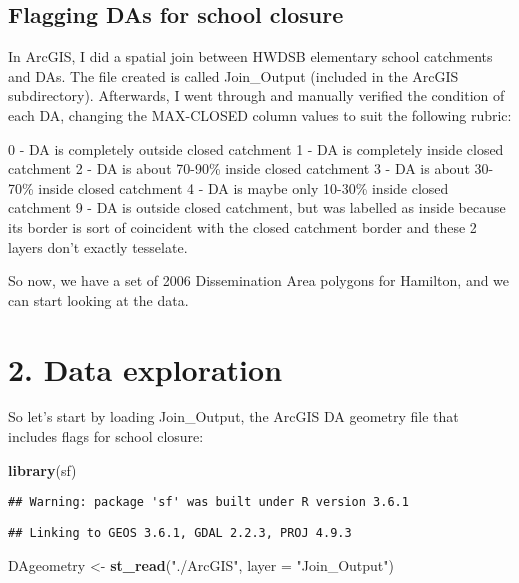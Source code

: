 \documentclass[]{article}
\newenvironment{Shaded}{\begin{snugshade}}{\end{snugshade}}
\newcommand{\DataTypeTok}[1]{\textcolor[rgb]{0.13,0.29,0.53}{#1}}
\newcommand{\KeywordTok}[1]{\textcolor[rgb]{0.13,0.29,0.53}{\textbf{#1}}}
\newcommand{\NormalTok}[1]{#1}
\newcommand{\StringTok}[1]{\textcolor[rgb]{0.31,0.60,0.02}{#1}}
\begin{document}
\hypertarget{flagging-das-for-school-closure}{%
\subsection{Flagging DAs for school
closure}\label{flagging-das-for-school-closure}}

In ArcGIS, I did a spatial join between HWDSB elementary school
catchments and DAs. The file created is called Join\_Output (included in
the ArcGIS subdirectory). Afterwards, I went through and manually
verified the condition of each DA, changing the MAX-CLOSED column values
to suit the following rubric:

0 - DA is completely outside closed catchment 1 - DA is completely
inside closed catchment 2 - DA is about 70-90\% inside closed catchment
3 - DA is about 30-70\% inside closed catchment 4 - DA is maybe only
10-30\% inside closed catchment 9 - DA is outside closed catchment, but
was labelled as inside because its border is sort of coincident with the
closed catchment border and these 2 layers don't exactly tesselate.

So now, we have a set of 2006 Dissemination Area polygons for Hamilton,
and we can start looking at the data.

\hypertarget{data-exploration}{%
\section{2. Data exploration}\label{data-exploration}}

So let's start by loading Join\_Output, the ArcGIS DA geometry file that
includes flags for school closure:

\begin{Shaded}
\begin{Highlighting}[]
\KeywordTok{library}\NormalTok{(sf)}
\end{Highlighting}
\end{Shaded}

\begin{verbatim}
## Warning: package 'sf' was built under R version 3.6.1
\end{verbatim}

\begin{verbatim}
## Linking to GEOS 3.6.1, GDAL 2.2.3, PROJ 4.9.3
\end{verbatim}

\begin{Shaded}
\begin{Highlighting}[]
\NormalTok{DAgeometry <-}\StringTok{ }\KeywordTok{st_read}\NormalTok{(}\StringTok{"./ArcGIS"}\NormalTok{, }\DataTypeTok{layer =} \StringTok{"Join_Output"}\NormalTok{)}
\end{Highlighting}
\end{Shaded}
\end{document}
